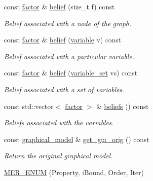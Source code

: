 \begin{DoxyCompactItemize}
const \hyperlink{classmerlin_1_1factor}{factor} \& \hyperlink{classmerlin_1_1jglp_a75fe3423fa5f1d46f5878de99f732ed4}{belief} (size\+\_\+t f) const 
\begin{DoxyCompactList}\small\item\em Belief associated with a node of the graph. \end{DoxyCompactList}\item 
const \hyperlink{classmerlin_1_1factor}{factor} \& \hyperlink{classmerlin_1_1jglp_ab682129e900ebd41c44b0516e7997a9e}{belief} (\hyperlink{classmerlin_1_1variable}{variable} v) const 
\begin{DoxyCompactList}\small\item\em Belief associated with a particular variable. \end{DoxyCompactList}\item 
const \hyperlink{classmerlin_1_1factor}{factor} \& \hyperlink{classmerlin_1_1jglp_abc9393073179fadfd12999faea87a62c}{belief} (\hyperlink{classmerlin_1_1variable__set}{variable\+\_\+set} vs) const 
\begin{DoxyCompactList}\small\item\em Belief associated with a set of variables. \end{DoxyCompactList}\item 
const std\+::vector$<$ \hyperlink{classmerlin_1_1factor}{factor} $>$ \& \hyperlink{classmerlin_1_1jglp_a44be9483e6b79d87f70fd7c893d8f70a}{beliefs} () const 
\begin{DoxyCompactList}\small\item\em Beliefs associated with the variables. \end{DoxyCompactList}\item 
\hypertarget{classmerlin_1_1jglp_adfca7a469dbd9a01486dca85af083b56}{}const \hyperlink{classmerlin_1_1graphical__model}{graphical\+\_\+model} \& \hyperlink{classmerlin_1_1jglp_adfca7a469dbd9a01486dca85af083b56}{get\+\_\+gm\+\_\+orig} () const \label{classmerlin_1_1jglp_adfca7a469dbd9a01486dca85af083b56}

\begin{DoxyCompactList}\small\item\em Return the original graphical model. \end{DoxyCompactList}\item 
\hypertarget{classmerlin_1_1jglp_a5d8e3e7d60cb2602dfd9dc9a6cb86478}{}\hyperlink{classmerlin_1_1jglp_a5d8e3e7d60cb2602dfd9dc9a6cb86478}{M\+E\+R\+\_\+\+E\+N\+U\+M} (Property, i\+Bound, Order, Iter)\label{classmerlin_1_1jglp_a5d8e3e7d60cb2602dfd9dc9a6cb86478}


\end{DoxyCompactItemize}
